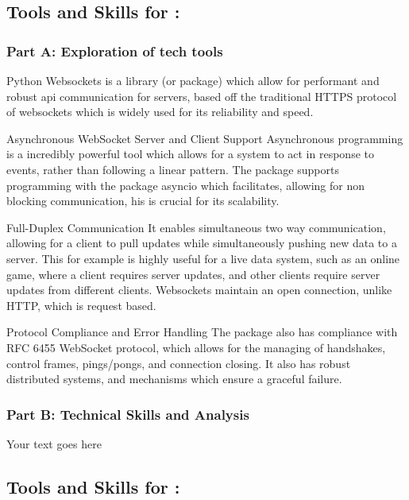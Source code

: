 \documentclass[a4paper, 11pt]{report}
\begin{document}

\subsection{Tools and Skills for \majC: \studC}

\subsubsection{Part A: Exploration of tech tools}

Python Websockets is a library (or package) which allow for performant and robust api communication for servers, based off the traditional HTTPS protocol of websockets which is widely used for its reliability and speed. 


Asynchronous WebSocket Server and Client Support
Asynchronous programming is a incredibly powerful tool which allows for a system to act in response to events, rather than following a linear pattern. The package supports programming with the package asyncio which facilitates, allowing for non blocking communication, his is crucial for its scalability. 


Full-Duplex Communication
It enables simultaneous two way communication, allowing for a client to pull updates while simultaneously pushing new data to a server. This for example is highly useful for a live data system, such as an online game, where a client requires server updates, and other clients require server updates from different clients. Websockets maintain an open connection, unlike HTTP, which is request based. 


Protocol Compliance and Error Handling
The package also has compliance with RFC 6455 WebSocket protocol, which allows for the managing of handshakes, control frames, pings/pongs, and connection closing. It also has robust distributed systems, and mechanisms which ensure a graceful failure.


\subsubsection{Part B: Technical Skills and Analysis}

Your text goes here




\subsection{Tools and Skills for \majD: \studD}
\end{document}
